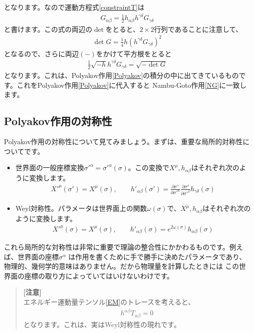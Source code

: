 \documentclass[report,paper=a4, fontsize=12pt, line_length=16cm, number_of_lines=33,dvipdfmx]{jlreq}
\numberwithin{equation}{chapter}
\numberwithin{equation}{section}
\newcommand{\del}{\partial}
\newenvironment{remark}{\begin{quote}\small\textbf{[注意]}\\ }{\end{quote}}
\begin{document}
となります。なので運動方程式\eqref{constraintT}は
\begin{align}
G_{\alpha\beta}=\frac12 h_{\alpha\beta}h^{\gamma\delta}G_{\gamma\delta}
\end{align}
と書けます。この式の両辺の$\det$をとると、$2\times 2$行列であることに注意して、
\begin{align}
\det G=\frac14 h (h^{\gamma\delta}G_{\gamma\delta})^2
\end{align}
となるので、さらに両辺$(-)$をかけて平方根をとると
\begin{align}
\frac12 \sqrt{-h}h^{\gamma\delta}G_{\gamma\delta}=\sqrt{-\det G}
\end{align}
となります。これは、Polyakov作用\eqref{Polyakov}の積分の中に出てきているものです。これをPolyakov作用\eqref{Polyakov}に代入すると
Nambu-Goto作用\eqref{NG}に一致します。
\subsection{Polyakov作用の対称性}
Polyakov作用の対称性について見てみましょう。まずは、重要な局所的対称性についてです。
\begin{itemize}
\item 世界面の一般座標変換$\sigma'^{\alpha}=\sigma'^{\alpha}(\sigma)$。この変換で$X^{\mu},h_{\alpha\beta}$はそれぞれ次のように変換します。
\begin{align}
X'^\mu(\sigma')=X^{\mu}(\sigma),\qquad
h'_{\alpha\beta}(\sigma') = 
\frac{\del \sigma^{\gamma}}{\del \sigma'^{\alpha}}
\frac{\del \sigma^{\delta}}{\del \sigma'^{\beta}}
h_{\gamma\delta}(\sigma)
\end{align}
\item Weyl対称性。パラメータは世界面上の関数$\omega(\sigma)$で、$X^{\mu},h_{\alpha\beta}$はそれぞれ次のように変換します。
\begin{align}
X'^\mu(\sigma)=X^{\mu}(\sigma),\qquad
h'_{\alpha\beta}(\sigma) =
e^{2\omega(\sigma)}
h_{\alpha\beta}(\sigma)
\end{align}
\end{itemize}
これら局所的な対称性は非常に重要で理論の整合性にかかわるものです。例えば、世界面の座標$\sigma^{\alpha}$
は作用を書くために手で勝手に決めたパラメータであり、物理的、幾何学的意味はありません。だから物理量を計算したときには
この世界面の座標の取り方によっていてはいけないわけです。
\begin{remark}
エネルギー運動量テンソル\eqref{EM}のトレースを考えると、
\begin{align}
h^{\alpha\beta}T_{\alpha\beta}=0
\end{align}
となります。これは、実はWeyl対称性の現れです。
\end{remark}
\end{document}
